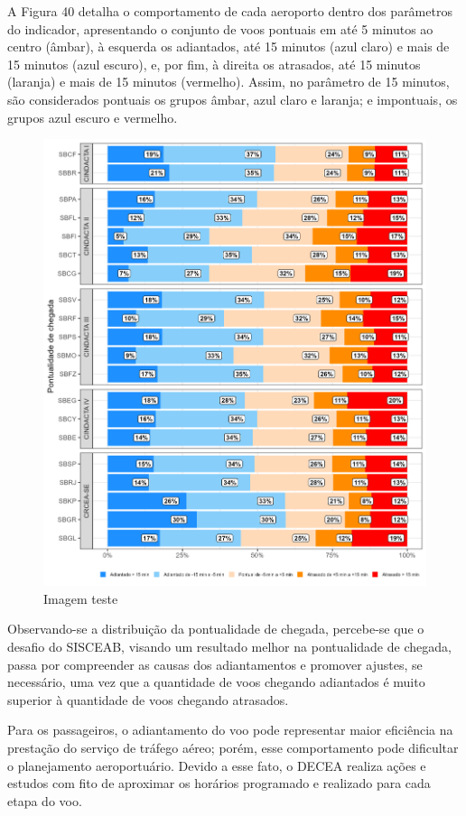 \documentclass[
]{book}
\begin{document}
A Figura 40 detalha o comportamento de cada aeroporto dentro dos parâmetros do indicador, apresentando o conjunto de voos pontuais em até 5 minutos ao centro (âmbar), à esquerda os adiantados, até 15 minutos (azul claro) e mais de 15 minutos (azul escuro), e, por fim, à direita os atrasados, até 15 minutos (laranja) e mais de 15 minutos (vermelho). Assim, no parâmetro de 15 minutos, são considerados pontuais os grupos âmbar, azul claro e laranja; e impontuais, os grupos azul escuro e vermelho.

\begin{figure}
\centering
\includegraphics{imagens/gf42.png}
\caption{Imagem teste}
\end{figure}

Observando-se a distribuição da pontualidade de chegada, percebe-se que o desafio do SISCEAB, visando um resultado melhor na pontualidade de chegada, passa por compreender as causas dos adiantamentos e promover ajustes, se necessário, uma vez que a quantidade de voos chegando adiantados é muito superior à quantidade de voos chegando atrasados.

Para os passageiros, o adiantamento do voo pode representar maior eficiência na prestação do serviço de tráfego aéreo; porém, esse comportamento pode dificultar o planejamento aeroportuário. Devido a esse fato, o DECEA realiza ações e estudos com fito de aproximar os horários programado e realizado para cada etapa do voo.
\end{document}
